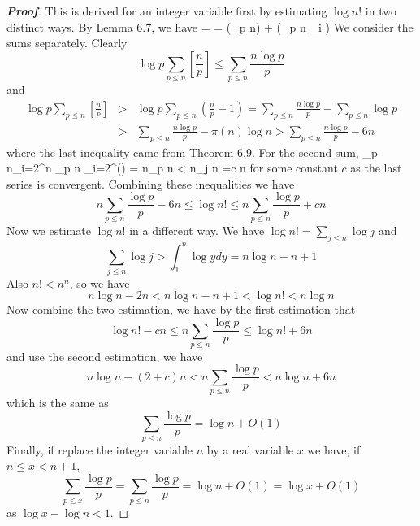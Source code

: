 \begin{proof}[\bf Proof] This is derived for an integer variable first by estimating $\log{n!}$ in two distinct ways. By Lemma 6.7, we have
\be
{} =  = \left(\sum_{p \le n}\right) +  \left(\sum_{p \le n} \sum_{i } \right)
\ee
We consider the sums separately. Clearly
$$\log{p} \sum_{p \le n}\left[\frac{n}{p}\right] \le \sum_{p \le n} \frac{n \log{p}}{p}$$
and
\begin{eqnarray*}
\log{p} \sum_{p \le n}\left[\frac{n}{p}\right] &>& \log{p} \sum_{p \le n}\left(\frac{n}{p}-1\right) = \sum_{p \le n} \frac{n \log{p}}{p} -\sum_{p \le n} \log{p}\\
&>&\sum_{p \le n} \frac{n \log{p}}{p} -\pi(n)\log{n} > \sum_{p \le n}\frac{n \log{p}}{p} -6n
\end{eqnarray*}
where the last inequality came from Theorem 6.9. For the second sum,
\be
{}\sum_{p \le n}\sum_{i=2}^{\infty}  \le  n  \sum_{p \le n} \sum_{i=2}^{\infty}\left(\right) = n\sum_{p \le n}  < n\sum_{j \le n} =c n
\ee
for some constant $c$ as the last series is convergent. Combining these inequalities we have
$$n\sum_{p \le n}\frac{\log{p}}{p}-6n \le \log{n!} \le n\sum_{p \le n}\frac{\log{p}}{p}+cn$$
Now we estimate $\log{n!}$ in a different way. We have $\log{n!}=\sum_{j \le n}\log{j}$ and
$$\sum_{j \le n}\log{j} > \int_1^n\log{y}dy=n\log{n}-n+1$$
Also $n! <n^n$, so we have
$$n\log{n}-2n< n\log{n}-n+1 <\log{n!}<n\log{n}$$
Now combine the two estimation, we have by the first estimation that
$$\log{n!}-cn \le n \sum_{p \le n} \frac{\log{p}}{p} \le \log{n!}+6n$$
and use the second estimation, we have
$$n\log{n}-(2+c)n < n\sum_{p \le n}\frac{\log{p}}{p} < n\log{n}+6n$$
which is the same as
$$\sum_{p \le n}\frac{\log{p}}{p}=\log{n}+O(1)$$
Finally, if replace the integer variable $n$ by a real variable $x$ we have, if $n \le x<n+1$,
$$\sum_{p \le x}\frac{\log{p}}{p}=\sum_{p \le n}\frac{\log{p}}{p}
=\log{n}+O(1)=\log{x}+O(1)$$
as $\log{x}-\log{n}<1$.
\end{proof}

